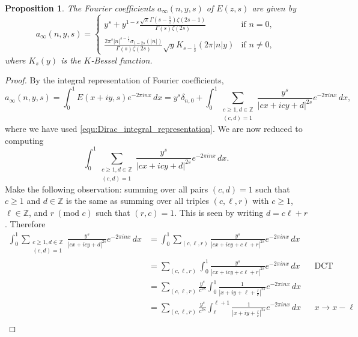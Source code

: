 \documentclass[12pt]{book}
\newtheorem{proposition}{Proposition}[section]
\theoremstyle{definition}\newframedtheorem{method}{Method}
\newcommand{\tmod}[1]{\ \left(\text{mod }#1\right)}
\newcommand{\Z}{\mathbb{Z}}
\renewcommand{\d}{\delta}
\newcommand{\z}{\zeta}
\newcommand{\s}{\sigma}
\newcommand{\G}{\Gamma}
\newcommand{\<}{\langle}
\renewcommand{\>}{\rangle}
\begin{document}
      \begin{proposition}\label{prop:Fourier_coefficients_of_real-analytic_Eisenstein_series}
        The Fourier coefficients $a_{\infty}(n,y,s)$ of $E(z,s)$ are given by
        \[
          a_{\infty}(n,y,s) = \begin{cases} y^{s}+y^{1-s}\frac{\sqrt{\pi}\G\left(s-\frac{1}{2}\right)\z(2s-1)}{\G(s)\z(2s)} & \text{if $n = 0$}, \\ \frac{2\pi^{s}|n|^{s-\frac{1}{2}}\s_{1-2s}(|n|)}{\G(s)\z(2s)}\sqrt{y}K_{s-\frac{1}{2}}(2\pi|n|y) & \text{if $n \neq 0$}, \end{cases}
        \]
        where $K_{s}(y)$ is the $K$-Bessel function.
      \end{proposition}
      \begin{proof}
        By the integral representation of Fourier coefficients,
        \begin{equation}\label{equ:real-analytic_Eisenstein_fourier_coefficient_definition}
          a_{\infty}(n,y,s) = \int_{0}^{1}E(x+iy,s)e^{-2\pi inx}\,dx = y^{s}\d_{n,0}+\int_{0}^{1}\sum_{\substack{c \ge 1, d \in \Z \\ (c,d) = 1}}\frac{y^{s}}{|cx+icy+d|^{2s}}e^{-2\pi inx}\,dx,
        \end{equation}
        where we have used \cref{equ:Dirac_integral_representation}. We are now reduced to computing
        \[
          \int_{0}^{1}\sum_{\substack{c \ge 1, d \in \Z \\ (c,d) = 1}}\frac{y^{s}}{|cx+icy+d|^{2s}}e^{-2\pi inx}\,dx.
        \]
        Make the following observation: summing over all pairs $(c,d) = 1$ such that $c \ge 1$ and $d \in \Z$ is the same as summing over all triples $(c,\ell,r)$ with $c \ge 1$, $\ell \in \Z$, and $r \tmod{c}$ such that $(r,c) = 1$. This is seen by writing $d = c\ell+r$. Therefore
        \begin{align*}
          \int_{0}^{1}\sum_{\substack{c \ge 1, d \in \Z \\ (c,d) = 1}}\frac{y^{s}}{|cx+icy+d|^{2s}}e^{-2\pi inx}\,dx &= \int_{0}^{1}\sum_{(c,\ell,r)}\frac{y^{s}}{|cx+icy+c\ell+r|^{2s}}e^{-2\pi inx}\,dx \\
          &= \sum_{(c,\ell,r)}\int_{0}^{1}\frac{y^{s}}{|cx+icy+c\ell+r|^{2s}}e^{-2\pi inx}\,dx &&\text{DCT} \\
          &= \sum_{(c,\ell,r)}\frac{y^{s}}{c^{2s}}\int_{0}^{1}\frac{1}{|x+iy+\ell+\frac{r}{c}|^{2s}}e^{-2\pi inx}\,dx \\
          &= \sum_{(c,\ell,r)}\frac{y^{s}}{c^{2s}}\int_{\ell}^{\ell+1}\frac{1}{|x+iy+\frac{r}{c}|^{2s}}e^{-2\pi inx}\,dx &&\text{$x \to x-\ell$} \\

\end{align*}
\end{proof}
\end{document}
